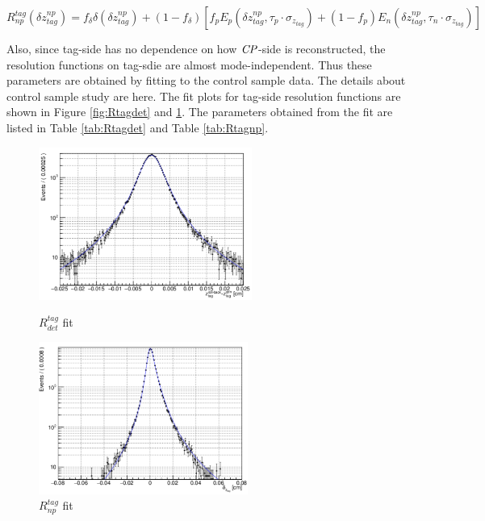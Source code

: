 \begin{equation}\label{eq:Rnp}
R_{np}^{tag}(\delta z_{tag}^{np})=f_{\delta}\delta(\delta z_{tag}^{np}) + 
(1-f_{\delta})[f_p E_p(\delta z_{tag}^{np},\tau_p\cdot \sigma_{z_{tag}}) +
(1-f_p)E_n(\delta z_{tag}^{np},\tau_n\cdot \sigma_{z_{tag}}) ]
\end{equation} 


Also, since tag-side has no dependence on how $\it{CP}$-side is reconstructed, the resolution functions on tag-sdie are almost mode-independent. Thus these parameters are obtained by fitting to the control sample data. The details about control sample study are here\cite{jpsiks_ichep}. The fit plots for tag-side resolution functions are shown in Figure \ref{fig:Rtagdet} and \ref{fig:Rtagnp}. The parameters obtained from the fit are listed in Table \ref{tab:Rtagdet} and Table \ref{tab:Rtagnp}.


\begin{figure}[H]
	\begin{minipage}[b]{0.5\linewidth}
		\centering
		\includegraphics[height=5cm]{figures/Rdet}
		\caption{$R_{det}^{tag} $ fit}
		\label{fig:Rtagdet}
	\end{minipage}
	\begin{minipage}[b]{0.5\linewidth}
		\centering
		\includegraphics[height=5cm]{figures/Rnp}
		\caption{$R_{np}^{tag}$ fit}
		\label{fig:Rtagnp}
	\end{minipage}
\end{figure}

